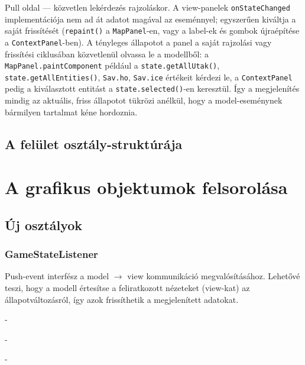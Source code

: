 Pull oldal — közvetlen lekérdezés rajzoláskor. A view-panelek \texttt{onStateChanged} implementációja nem ad át adatot magával az eseménnyel; egyszerűen kiváltja a saját frissítését (\texttt{repaint()} a \texttt{MapPanel}-en, vagy a label-ek és gombok újraépítése a \texttt{ContextPanel}-ben). A tényleges állapotot a panel a saját rajzolási vagy frissítési ciklusában közvetlenül olvassa le a modellből: a \texttt{MapPanel.paintComponent} például a \texttt{state.getAllUtak()}, \texttt{state.getAllEntities()}, \texttt{Sav.ho}, \texttt{Sav.ice} értékeit kérdezi le, a \texttt{ContextPanel} pedig a kiválasztott entitást a \texttt{state.selected()}-en keresztül. Így a megjelenítés mindig az aktuális, friss állapotot tükrözi anélkül, hogy a model-eseménynek bármilyen tartalmat kéne hordoznia.

\pagebreak
\subsection{A felület osztály-struktúrája}
\pagebreak


\section{A grafikus objektumok felsorolása}
\subsection{Új osztályok}


\subsubsection{GameStateListener}
\begin{class-template-responsibility}
    Push-event interfész a model $\rightarrow$ view kommunikáció megvalósításához. Lehetővé teszi, hogy a modell értesítse a feliratkozott nézeteket (view-kat) az állapotváltozásról, így azok frissíthetik a megjelenített adatokat.
\end{class-template-responsibility}
\begin{class-template-interface}
    -
\end{class-template-interface}
\begin{class-template-baseclass}
    -
\end{class-template-baseclass}
\begin{class-template-attribute}
    -
\end{class-template-attribute}
\begin{class-template-method}
\end{class-template-method} 

